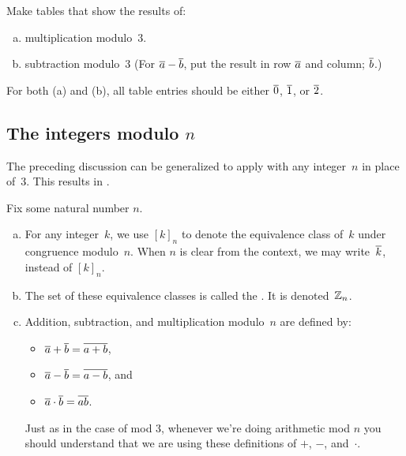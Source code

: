\begin{exercise}\label{exercise:EquivalenceRelationsChap:Mod3TablesEx}
Make tables that show the results of:
\begin{enumerate}[(a)]
\item \label{Mod3TablesEx-multiplication}
multiplication modulo~$3$.
\item \label{Mod3TablesEx-subtraction}
subtraction modulo~$3$ (For $\overline{a} - \overline{b}$,  put the result in row $\overline{a}$ and column; $\overline{b}$.)
\end{enumerate}
For both (a) and (b), all table entries should be  either\/ $\overline{0}$, $\overline{1}$, or\/ $\overline{2}$.
\end{exercise}



\subsection{The integers modulo $n$}
The preceding discussion can be generalized to apply with any integer~$n$ in place of~$3$. This results in .

\begin{defn} \label{integ_mod_n}
Fix some natural number $n$.
\begin{enumerate}[(a)]
\item For any integer~$k$, we use $[k]_n$ to denote the equivalence class of~$k$ under congruence modulo~$n$. When $n$ is clear from the context, we may write~$\overline{k}$, instead of $[k]_n$.
\item The set of these equivalence classes is called the . It is denoted~$\mathbb{Z}_n$.

 \item Addition, subtraction, and multiplication modulo~$n$ are defined by:
\begin{itemize}
\item $\overline{a} \mathbin{+} \overline{b} = \overline{a + b}$,
\item $\overline{a} \mathbin{-} \overline{b} = \overline{a - b}$,
and
\item $\overline{a} \cdot \overline{b} = \overline{a  b}$.
\end{itemize}
Just as in the case of mod 3, whenever we're doing arithmetic mod $n$ you should understand that we are using these definitions of  $+$, $-$, and~$\cdot$.
\end{enumerate}
\end{defn}


